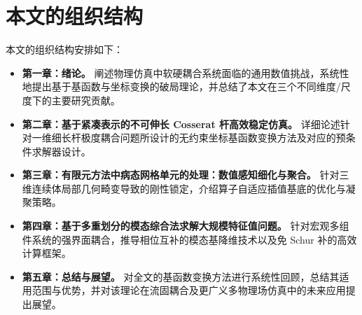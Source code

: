 
\section{本文的组织结构}

本文的组织结构安排如下：

\begin{itemize}
  \item \textbf{第一章：绪论。} 阐述物理仿真中软硬耦合系统面临的通用数值挑战，系统性地提出基于基函数与坐标变换的破局理论，并总结了本文在三个不同维度/尺度下的主要研究贡献。
  \item \textbf{第二章：基于紧凑表示的不可伸长 Cosserat 杆高效稳定仿真。} 详细论述针对一维细长杆极度耦合问题所设计的无约束坐标基函数变换方法及对应的预条件求解器设计。
  \item \textbf{第三章：有限元方法中病态网格单元的处理：数值感知细化与聚合。} 针对三维连续体局部几何畸变导致的刚性锁定，介绍算子自适应插值基底的优化与凝聚策略。
  \item \textbf{第四章：基于多重划分的模态综合法求解大规模特征值问题。} 针对宏观多组件系统的强界面耦合，推导相位互补的模态基降维技术以及免 Schur 补的高效计算框架。
  \item \textbf{第五章：总结与展望。} 对全文的基函数变换方法进行系统性回顾，总结其适用范围与优势，并对该理论在流固耦合及更广义多物理场仿真中的未来应用提出展望。
\end{itemize}
